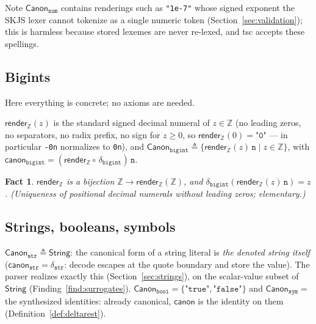 \documentclass[11pt]{article}
\newtheorem{fact}[theorem]{Fact}
\newcommand{\String}{\mathsf{String}}
\newcommand{\Canon}[1]{\mathsf{Canon}_{\texttt{#1}}}
\newcommand{\canon}{\mathsf{canon}}
\newcommand{\render}{\mathsf{render}}
\begin{document}
Note $\Canon{num}$ contains renderings such as \texttt{"1e-7"} whose
signed exponent the SKJS lexer cannot tokenize as a single
numeric token (Section~\ref{sec:validation}); this is harmless because
stored lexemes are never re-lexed, and tsc accepts these spellings.

\subsection{Bigints}
\label{sec:canon-bigint}

Here everything is concrete; no axioms are needed.

\begin{definition}
\label{def:canonbigint}
$\render_{\mathbb{Z}}(z)$ is the standard signed decimal numeral of
$z \in \mathbb{Z}$ (no leading zeros, no separators, no radix prefix, no
sign for $z \geq 0$, so $\render_{\mathbb{Z}}(0) = \texttt{"0"}$ ---
in particular \texttt{-0n} normalizes to \texttt{0n}), and
$\Canon{bigint} \triangleq \{\render_{\mathbb{Z}}(z)\,\texttt{n} \mid z
\in \mathbb{Z}\}$, with
$\canon_{\texttt{bigint}} = (\render_{\mathbb{Z}} \circ\,
\delta_{\texttt{bigint}})\,\texttt{n}$.
\end{definition}

\begin{fact}
\label{fact:decimal}
$\render_{\mathbb{Z}}$ is a bijection $\mathbb{Z} \to
\render_{\mathbb{Z}}(\mathbb{Z})$, and
$\delta_{\texttt{bigint}}(\render_{\mathbb{Z}}(z)\,\texttt{n}) = z$.
(Uniqueness of positional decimal numerals without leading zeros;
elementary.)
\end{fact}

\subsection{Strings, booleans, symbols}
\label{sec:canon-rest}

$\Canon{str} \triangleq \String$: the canonical form of a string literal
is \emph{the denoted string itself} ($\canon_{\texttt{str}} =
\delta_{\texttt{str}}$: decode escapes at the quote boundary and store
the value). The parser realizes exactly this
(Section~\ref{sec:strings}), on the scalar-value subset of $\String$
(Finding~\ref{find:surrogates}). $\Canon{bool} = \{\texttt{"true"},
\texttt{"false"}\}$ and $\Canon{sym} = $ the synthesized identities:
already canonical, $\canon$ is the identity on them
(Definition~\ref{def:deltarest}).
\end{document}
